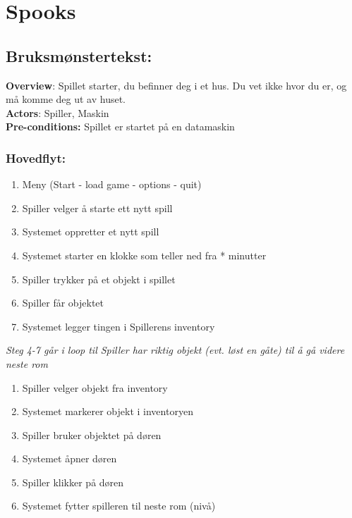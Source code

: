 \documentclass[12pt]{report}
\begin{document}
\section*{Spooks}

\subsection*{Bruksm{\o}nstertekst:}

\textbf{Overview}: Spillet starter, du befinner deg i et hus. Du vet ikke hvor du er,
og m{\aa} komme deg ut av huset. 
\bigskip \\
\textbf{Actors}: Spiller, Maskin 
\bigskip \\
\textbf{Pre-conditions:} Spillet er startet p{\aa} en datamaskin

\subsubsection*{Hovedflyt:}

\begin{enumerate}
\item Meny (Start - load game - options - quit)
\item Spiller velger {\aa} starte ett nytt spill
\item Systemet oppretter et nytt spill
\item Systemet starter en klokke som teller ned fra * minutter
\item Spiller trykker p{\aa} et objekt i spillet
\item Spiller f{\aa}r objektet
\item Systemet legger tingen i Spillerens inventory
\end{enumerate}

\textit{Steg 4-7 g{\aa}r i loop til Spiller har riktig objekt (evt. l{\o}st en g{\aa}te) til {\aa} g{\aa} videre neste
rom}

\begin{enumerate}[resume]
\item Spiller velger objekt fra inventory
\item Systemet markerer objekt i inventoryen
\item Spiller bruker objektet p{\aa} d{\o}ren
\item Systemet {\aa}pner d{\o}ren
\item Spiller klikker p{\aa} d{\o}ren
\item Systemet fytter spilleren til neste rom (niv{\aa})
\end{enumerate}
\end{document}
